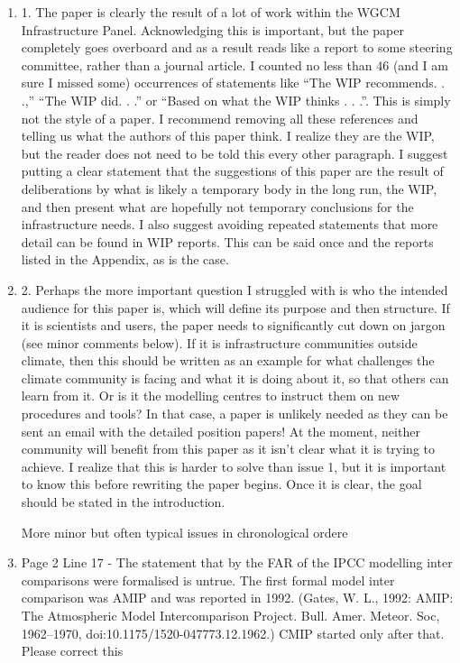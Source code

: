 \documentclass[gmd,manuscript]{copernicus}
\begin{document}
\begin{enumerate}[label=RC3-\arabic*,leftmargin=*]
\item 1. The paper is clearly the result of a lot of work within the
  WGCM Infrastructure Panel. Acknowledging this is important, but the
  paper completely goes overboard and as a result reads like a report
  to some steering committee, rather than a journal article. I counted
  no less than 46 (and I am sure I missed some) occurrences of
  statements like “The WIP recommends. . .,” “The WIP did. . .” or
  “Based on what the WIP thinks . . .”. This is simply not the style
  of a paper. I recommend removing all these references and telling us
  what the authors of this paper think. I realize they are the WIP,
  but the reader does not need to be told this every other paragraph.
  I suggest putting a clear statement that the suggestions of this
  paper are the result of deliberations by what is likely a temporary
  body in the long run, the WIP, and then present what are hopefully
  not temporary conclusions for the infrastructure needs. I also
  suggest avoiding repeated statements that more detail can be found
  in WIP reports. This can be said once and the reports listed in the
  Appendix, as is the case.
\item 2. Perhaps the more important question I struggled with is who the
  intended audience for this paper is, which will define its purpose
  and then structure. If it is scientists and users, the paper needs
  to significantly cut down on jargon (see minor comments below). If
  it is infrastructure communities outside climate, then this should
  be written as an example for what challenges the climate community
  is facing and what it is doing about it, so that others can learn
  from it. Or is it the modelling centres to instruct them on new
  procedures and tools? In that case, a paper is unlikely needed as
  they can be sent an email with the detailed position papers! At the
  moment, neither community will benefit from this paper as it isn’t
  clear what it is trying to achieve. I realize that this is harder to
  solve than issue 1, but it is important to know this before
  rewriting the paper begins. Once it is clear, the goal should be
  stated in the introduction.

  More minor but often typical issues in chronological ordere
\item Page 2 Line 17 - The statement that by the FAR of the IPCC
  modelling inter comparisons were formalised is untrue. The first
  formal model inter comparison was AMIP and was reported in 1992.
  (Gates, W. L., 1992: AMIP: The Atmospheric Model Intercomparison
  Project. Bull. Amer. Meteor. Soc, 1962--1970,
  doi:10.1175/1520-047773.12.1962.) CMIP started only after that.
  Please correct this


\end{enumerate}
\end{document}

